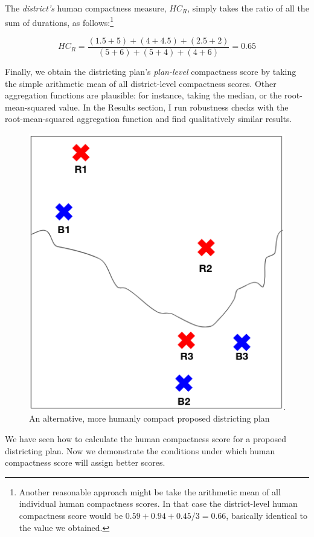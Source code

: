 \documentclass[]{article}
\begin{document}
The \emph{district's} human compactness measure, \(HC_R\), simply takes
the ratio of all the sum of durations, as follows:\footnote{Another
  reasonable approach might be take the arithmetic mean of all
  individual human compactness scores. In that case the district-level
  human compactness score would be \(0.59 + 0.94 + 0.45 / 3 = 0.66\),
  basically identical to the value we obtained.}

\[HC_R = \frac{(1.5+5) + (4 + 4.5) + (2.5 + 2)}{(5+6) + (5+4) + (4+6)} =
0.65\]

Finally, we obtain the districting plan's \emph{plan-level} compactness
score by taking the simple arithmetic mean of all district-level
compactness scores. Other aggregation functions are plausible: for
instance, taking the median, or the root-mean-squared value. In the
Results section, I run robustness checks with the root-mean-squared
aggregation function and find qualitatively similar results.

\begin{figure}
\centering
\includegraphics{img/human_compactness_3.png}
\caption{An alternative, more humanly compact proposed districting plan
\label{hc_better}}
\end{figure}

We have seen how to calculate the human compactness score for a proposed
districting plan. Now we demonstrate the conditions under which human
compactness score will assign better scores.
\end{document}
